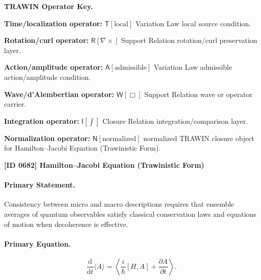 \par\vspace{0.45\baselineskip}
\noindent\begin{minipage}[t]{\linewidth}
\begingroup
\small
\raggedright
\textbf{TRAWIN Operator Key.}\par
\noindent\textbf{Time/localization operator:} $\mathsf{T}\!\left[\mathrm{local}\right]$ Variation Law local source condition.\par
\noindent\textbf{Rotation/curl operator:} $\mathsf{R}\!\left[\nabla\times\right]$ Support Relation rotation/curl preservation layer.\par
\noindent\textbf{Action/amplitude operator:} $\mathsf{A}\!\left[\mathrm{admissible}\right]$ Variation Law admissible action/amplitude condition.\par
\noindent\textbf{Wave/d'Alembertian operator:} $\mathsf{W}\!\left[\Box\right]$ Support Relation wave or operator carrier.\par
\noindent\textbf{Integration operator:} $\mathsf{I}\!\left[\int\right]$ Closure Relation integration/comparison layer.\par
\noindent\textbf{Normalization operator:} $\mathsf{N}\!\left[\mathrm{normalized}\right]$ normalized TRAWIN closure object for Hamilton--Jacobi Equation (Trawinistic Form).\par
\endgroup
\end{minipage}

\clearpage
\noindent\textbf{[ID 0682] Hamilton--Jacobi Equation (Trawinistic Form)}\par
\vspace{0.35em}
\paragraph{Primary Statement.}
Consistency between micro and macro descriptions requires that ensemble averages of quantum observables satisfy classical conservation laws and equations of motion when decoherence is effective.

\paragraph{Primary Equation.}
\begin{equation}
\frac{\mathrm{d}}{\mathrm{d}t}\langle A\rangle
=
\left\langle
\frac{i}{\hbar}[H,A]
+
\frac{\partial A}{\partial t}
\right\rangle .
\end{equation}

